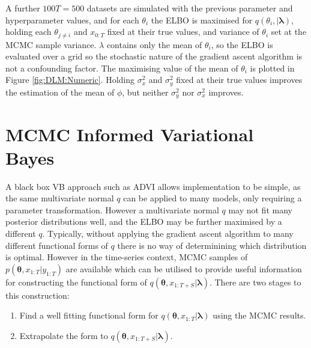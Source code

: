 \documentclass[12pt,a4paper]{article}%
\numberwithin{equation}{section}
\begin{document}
A further $100 T = 500$ datasets are simulated with the previous parameter and hyperparameter values, and for each $\theta_i$ the ELBO is maximised for $q(\theta_i, | \boldsymbol{\lambda})$, holding each $\theta_{j \neq i}$ and $x_{0:T}$ fixed at their true values, and variance of $\theta_i$ set at the MCMC sample variance. $\lambda$ contains only the mean of $\theta_i$, so the ELBO is evaluated over a grid so the stochastic nature of the gradient ascent algorithm is not a confounding factor. The maximising value of the mean of $\theta_i$ is plotted in Figure \ref{fig:DLM:Numeric}. Holding $\sigma^2_x$ and $\sigma^2_y$ fixed at their true values improves the estimation of the mean of $\phi$, but neither $\sigma^2_y$ nor $\sigma^2_x$ improves. 

\iffalse
\begin{figure}[h]
\centering
\texttt{[image: DLMNumeric]}
\caption{The ELBO maximising mean for each $\theta$ parameter, holding each other $\theta$ and $x_{0:T}$ fixed at their true values. Estimation of the mean of $\phi$ and $\sigma^2_x$ improves relative to Figure \ref{fig:DLM:ADVI} but the posterior mean of $\sigma^2_y$ is consistently over-estimated.}
\label{fig:DLM:Numeric}
\end{figure}
\fi

\section{MCMC Informed Variational Bayes}
\label{MIVB}

A black box VB approach such as ADVI allows implementation to be simple, as the same multivariate normal $q$ can be applied to many models, only requiring a parameter transformation. However a multivariate normal $q$ may not fit many posterior distributions well, and the ELBO may be further maximised by a different $q$. Typically, without applying the gradient ascent algorithm to many different functional forms of $q$ there is no way of determinining which distribution is optimal. However in the time-series context, MCMC samples of $p(\boldsymbol{\theta}, x_{1:T} | y_{1:T})$ are available which can be utilised to provide useful information for constructing the functional form of $q(\boldsymbol{\theta}, x_{1:T+S} | \boldsymbol{\lambda})$. There are two stages to this construction:
\begin{enumerate}
\item Find a well fitting functional form for $q(\boldsymbol{\theta}, x_{1:T} | \boldsymbol{\lambda})$ using the MCMC results.
\item Extrapolate the form to $q(\boldsymbol{\theta}, x_{1:T+S} | \boldsymbol{\lambda})$.
\end{enumerate}
\end{document}
